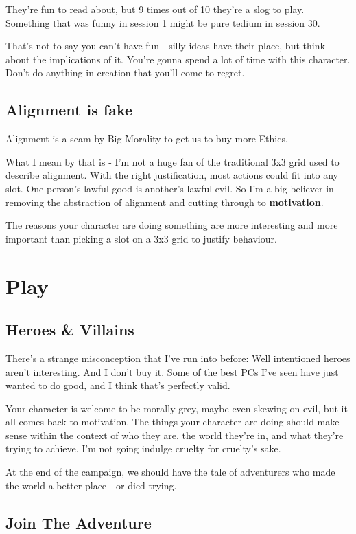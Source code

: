 They're fun to read about, but 9 times out of 10 they're a slog to play. Something that was funny in session 1 might be pure tedium in session 30.

That's not to say you can't have fun - silly ideas have their place, but think about the implications of it. You're gonna spend a lot of time with this character. Don't do anything in creation that you'll come to regret.

\subsection {Alignment is fake}

Alignment is a scam by Big Morality to get us to buy more Ethics.

What I mean by that is - I'm not a huge fan of the traditional 3x3 grid used to describe alignment. With the right justification, most actions could fit into any slot. One person's lawful good is another's lawful evil. So I'm a big believer in removing the abstraction of alignment and cutting through to \textbf{motivation}.

The reasons your character are doing something are more interesting and more important than picking a slot on a 3x3 grid to justify behaviour.

\section {Play}

\subsection {Heroes \& Villains}

There's a strange misconception that I've run into before: Well intentioned heroes aren't interesting. And I don't buy it. Some of the best PCs I've seen have just wanted to do good, and I think that's perfectly valid.

Your character is welcome to be morally grey, maybe even skewing on evil, but it all comes back to motivation. The things your character are doing should make sense within the context of who they are, the world they're in, and what they're trying to achieve. I'm not going indulge cruelty for cruelty's sake.

At the end of the campaign, we should have the tale of adventurers who made the world a better place - or died trying.

\subsection {Join The Adventure}

